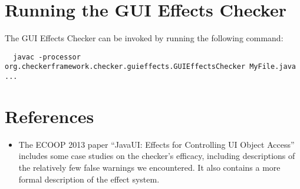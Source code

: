 \section{Running the GUI Effects Checker\label{gui-running}}

The GUI Effects Checker can be invoked by running the following command:
\begin{Verbatim}
  javac -processor org.checkerframework.checker.guieffects.GUIEffectsChecker MyFile.java ...
\end{Verbatim}


\section{References\label{guieffects-references}}

\begin{itemize}
\item The ECOOP 2013 paper ``JavaUI: Effects for Controlling UI Object Access''
    includes some case
    studies on the checker's efficacy, including descriptions of the relatively few false warnings
    we encountered.
    It also contains a more formal description of the effect system.\\

\end{itemize}


